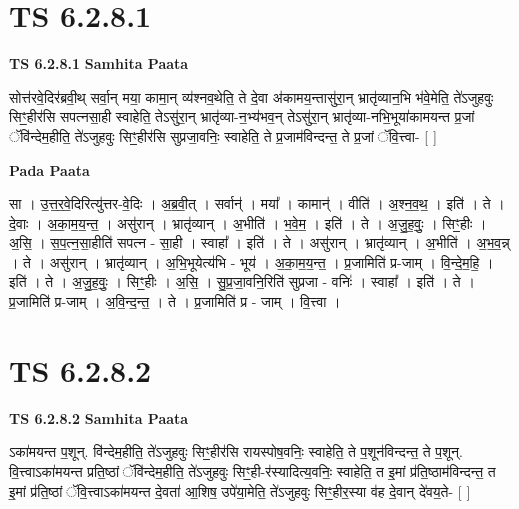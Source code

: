 \documentclass[17pt]{extarticle}
\begin{document}

\section{ TS 6.2.8.1 }

\textbf{TS 6.2.8.1 } \newline
\textbf{Samhita Paata} \newline

सोत्त॑रवे॒दिर॑ब्रवी॒थ् सर्वा॒न् मया॒ कामा॒न् व्य॑श्नव॒थेति॒ ते दे॒वा अ॑कामय॒न्तासु॑रा॒न् भ्रातृ॑व्यान॒भि भ॑वे॒मेति॒ ते॑ऽजुहवुः सिꣳ॒॒हीर॑सि सपत्नसा॒ही स्वाहेति॒ तेऽसु॑रा॒न् भ्रातृ॑व्या-न॒भ्य॑भव॒न् तेऽसु॑रा॒न् भ्रातृ॑व्या-नभि॒भूया॑कामयन्त प्र॒जां ॅवि॑न्देम॒हीति॒ ते॑ऽजुहवुः सिꣳ॒॒हीर॑सि सुप्रजा॒वनिः॒ स्वाहेति॒ ते प्र॒जाम॑विन्दन्त॒ ते प्र॒जां ॅवि॒त्त्वा- [  ] \newline

\textbf{Pada Paata} \newline

सा । उ॒त्त॒र॒वे॒दिरित्यु॑त्तर-वे॒दिः । अ॒ब्र॒वी॒त् । सर्वान्॑ । मया᳚ । कामान्॑ । वीति॑ । अ॒श्न॒व॒थ॒ । इति॑ । ते । दे॒वाः । अ॒का॒म॒य॒न्त॒ । असु॑रान् । भ्रातृ॑व्यान् । अ॒भीति॑ । भ॒वे॒म॒ । इति॑ । ते । अ॒जु॒ह॒वुः॒ । सिꣳ॒॒हीः । अ॒सि॒ । स॒प॒त्न॒सा॒हीति॑ सपत्न - सा॒ही । स्वाहा᳚ । इति॑ । ते । असु॑रान् । भ्रातृ॑व्यान् । अ॒भीति॑ । अ॒भ॒व॒न्न् । ते । असु॑रान् । भ्रातृ॑व्यान् । अ॒भि॒भूयेत्य॑भि - भूय॑ । अ॒का॒म॒य॒न्त॒ । प्र॒जामिति॑ प्र-जाम् । वि॒न्दे॒म॒हि॒ । इति॑ । ते । अ॒जु॒ह॒वुः॒ । सिꣳ॒॒हीः । अ॒सि॒ । सु॒प्र॒जा॒वनि॒रिति॑ सुप्रजा - वनिः॑ । स्वाहा᳚ । इति॑ । ते । प्र॒जामिति॑ प्र-जाम् । अ॒वि॒न्द॒न्त॒ । ते । प्र॒जामिति॑ प्र - जाम् । वि॒त्त्वा ।  \newline





\section{ TS 6.2.8.2 }

\textbf{TS 6.2.8.2 } \newline
\textbf{Samhita Paata} \newline

ऽका॑मयन्त प॒शून्. वि॑न्देम॒हीति॒ ते॑ऽजुहवुः सिꣳ॒॒हीर॑सि रायस्पोष॒वनिः॒ स्वाहेति॒ ते प॒शून॑विन्दन्त॒ ते प॒शून्. वि॒त्त्वाऽका॑मयन्त प्रति॒ष्ठां ॅवि॑न्देम॒हीति॒ ते॑ऽजुहवुः सिꣳ॒॒ही-र॑स्यादित्य॒वनिः॒ स्वाहेति॒ त इ॒मां प्र॑ति॒ष्ठाम॑विन्दन्त॒ त इ॒मां प्र॑ति॒ष्ठां ॅवि॒त्त्वाऽका॑मयन्त दे॒वता॑ आ॒शिष॒ उपे॑या॒मेति॒ ते॑ऽजुहवुः सिꣳ॒॒हीर॒स्या व॑ह दे॒वान् दे॑वय॒ते- [  ] \newline
\end{document}
